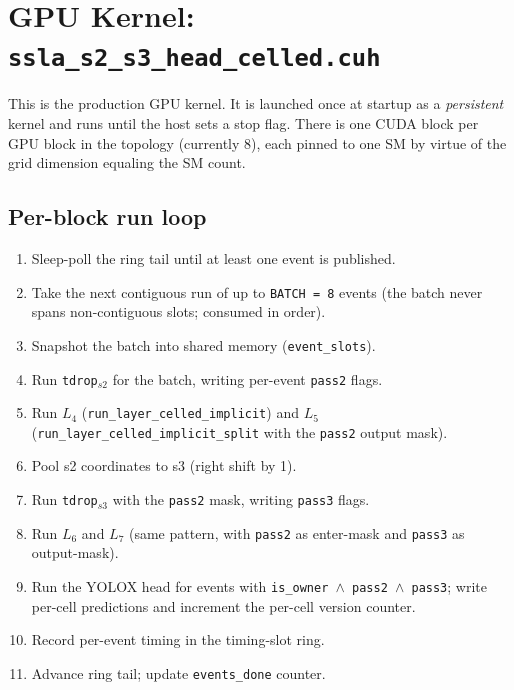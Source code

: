 \documentclass[11pt,a4paper]{article}
\begin{document}
\section{GPU Kernel: \texttt{ssla\_s2\_s3\_head\_celled.cuh}}

This is the production GPU kernel. It is launched once at startup as a
\emph{persistent} kernel and runs until the host sets a stop flag.
There is one CUDA block per GPU block in the topology (currently 8),
each pinned to one SM by virtue of the grid dimension equaling the SM
count.

\subsection{Per-block run loop}

\begin{enumerate}[itemsep=0pt]
  \item Sleep-poll the ring tail until at least one event is published.
  \item Take the next contiguous run of up to \texttt{BATCH = 8} events
        (the batch never spans non-contiguous slots; consumed in order).
  \item Snapshot the batch into shared memory (\texttt{event\_slots}).
  \item Run \texttt{tdrop\(_{s2}\)} for the batch, writing per-event
        \texttt{pass2} flags.
  \item Run \(L_4\) (\texttt{run\_layer\_celled\_implicit}) and \(L_5\)
        (\texttt{run\_layer\_celled\_implicit\_split} with the
        \texttt{pass2} output mask).
  \item Pool s2 coordinates to s3 (right shift by 1).
  \item Run \texttt{tdrop\(_{s3}\)} with the \texttt{pass2} mask,
        writing \texttt{pass3} flags.
  \item Run \(L_6\) and \(L_7\) (same pattern, with \texttt{pass2} as
        enter-mask and \texttt{pass3} as output-mask).
  \item Run the YOLOX head for events with
        \texttt{is\_owner $\wedge$ pass2 $\wedge$ pass3}; write
        per-cell predictions and increment the per-cell version
        counter.
  \item Record per-event timing in the timing-slot ring.
  \item Advance ring tail; update \texttt{events\_done} counter.
\end{enumerate}
\end{document}
